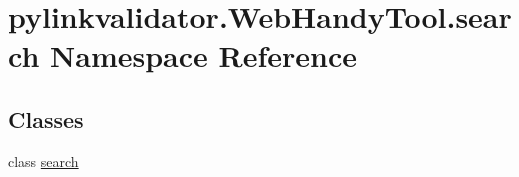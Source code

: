 \hypertarget{namespacepylinkvalidator_1_1_web_handy_tool_1_1search}{}\section{pylinkvalidator.\+Web\+Handy\+Tool.\+search Namespace Reference}
\label{namespacepylinkvalidator_1_1_web_handy_tool_1_1search}
\subsection*{Classes}
\begin{DoxyCompactItemize}
\item 
class \hyperlink{classpylinkvalidator_1_1_web_handy_tool_1_1search_1_1search}{search}
\end{DoxyCompactItemize}
